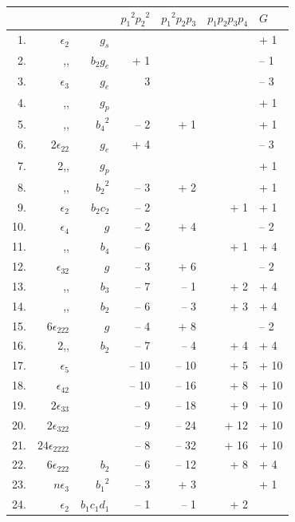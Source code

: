 \documentclass[11pt,a4paper]{book}
\begin{document}
\begin{center}
\begin{tabular}{r @{\quad} r @{\quad} r | r | r | r}
& & & ${p_1}^2{p_2}^2$ & ${p_1}^2p_2p_3$ & $p_1p_2p_3p_4$ & $G$ \\ .& $\epsilon_2$ & $g_s$ & & & & + 1 \\
2.& ,, & $b_2g_e$ & + 1 & & & -- 1 \\
3.& $\epsilon_3$ & $g_e$ & 3 & & & -- 3 \\
4.& ,, & $g_p$ & & & & + 1 \\
5.& ,, & ${b_4}^2$ & -- 2 & + 1 & & + 1 \\
6.& $2\epsilon_{22}$ & $g_e$ & + 4 & & & -- 3 \\
7.& 2,, & $g_p$ & & & & + 1 \\
8.& ,, & ${b_2}^2$ & -- 3 & + 2 & & + 1 \\
9.& $\epsilon_2$ & $b_2c_2$ & -- 2 & & + 1 & + 1 \\
10.& $\epsilon_4$ & $g$ & -- 2 & + 4 & & -- 2 \\
11.& ,, & $b_4$ & -- 6 & & + 1 & + 4 \\
12.& $\epsilon_{32}$ & $g$ & -- 3 & + 6 & & -- 2 \\
13.& ,, & $b_3$ & -- 7 & -- 1 & + 2 & + 4 \\
14.& ,, & $b_2$ & -- 6 & -- 3 & + 3 & + 4 \\
15.& $6\epsilon_{222}$ & $g$ & -- 4 & + 8 & & -- 2 \\
16.& 2,, & $b_2$ & -- 7 & -- 4 & + 4 & + 4 \\
17.& $\epsilon_5$ & & -- 10 & -- 10 & + 5 & + 10 \\
18.& $\epsilon_{42}$ & & -- 10 & -- 16 & + 8 & + 10 \\
19.& $2\epsilon_{33}$ & & -- 9 & -- 18 & + 9 & + 10 \\
20.& $2\epsilon_{322}$ & & -- 9 & -- 24 & + 12 & + 10 \\
21.& $24\epsilon_{2222}$ & & -- 8 & -- 32 & + 16 & + 10 \\
22.& $6\epsilon_{222}$ & $b_2$ & -- 6 & -- 12 & + 8 & + 4 \\
23.& $n\epsilon_3$ & ${b_1}^2$ & -- 3 & + 3 & & + 1 \\
24.& $\epsilon_2$ & $b_1c_1d_1$ & -- 1 & -- 1 & + 2 & \\
\end{tabular}
\end{center}
\end{document}
